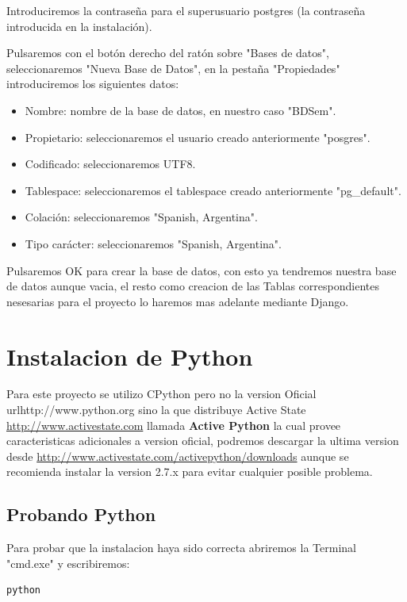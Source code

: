 Introduciremos la contraseña para el superusuario postgres
(la contraseña introducida en la instalación).

Pulsaremos con el botón derecho del ratón sobre "Bases de datos", seleccionaremos
"Nueva Base de Datos", en la pestaña "Propiedades" introduciremos los
siguientes datos:

\begin{itemize}
    \item Nombre: nombre de la base de datos, en nuestro caso "BDSem".
    \item Propietario: seleccionaremos el usuario creado anteriormente "posgres".
    \item Codificado: seleccionaremos UTF8.
    \item Tablespace: seleccionaremos el tablespace creado anteriormente "pg\_default".
    \item Colación: seleccionaremos "Spanish, Argentina".
    \item Tipo carácter: seleccionaremos "Spanish, Argentina".
\end{itemize}

Pulsaremos OK para crear la base de datos, con esto ya tendremos nuestra base
de datos aunque vacia, el resto como creacion de las Tablas correspondientes
nesesarias para el proyecto lo haremos mas adelante mediante Django.



\section{Instalacion de Python}

Para este proyecto se utilizo CPython pero no la version Oficial url{http://www.python.org}
sino la que distribuye Active State \url{http://www.activestate.com} llamada
{\bfseries Active Python} la cual provee caracteristicas adicionales a version oficial,
podremos descargar la ultima version desde \url{http://www.activestate.com/activepython/downloads}
aunque se recomienda instalar la version 2.7.x para evitar cualquier posible problema.

\subsection{Probando Python}
Para probar que la instalacion haya sido correcta abriremos la Terminal "cmd.exe"
y escribiremos:

\begin{lstlisting}[style=consola, numbers=none]
    python
\end{lstlisting} 

